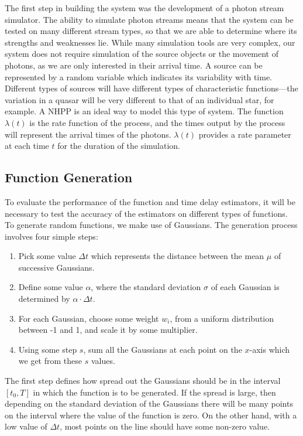 \documentclass[a4paper,11pt]{article}
\begin{document}
  The first step in building the system was the development of a photon stream
  simulator. The ability to simulate photon streams means that the system can be
  tested on many different stream types, so that we are able to determine where
  its strengths and weaknesses lie. While many simulation tools are very
  complex, our system does not require simulation of the source objects or the
  movement of photons, as we are only interested in their arrival time. A source
  can be represented by a random variable which indicates its variability with
  time. Different types of sources will have different types of characteristic
  functions---the variation in a quasar will be very different to that of an
  individual star, for example. A NHPP is an ideal way to model this type of
  system. The function $\lambda(t)$ is the rate function of the process, and the
  times output by the process will represent the arrival times of the
  photons. $\lambda(t)$ provides a rate parameter at each time $t$ for the
  duration of the simulation.
\subsection{Function Generation}
\label{sec-3-1}

   To evaluate the performance of the function and time delay estimators, it
   will be necessary to test the accuracy of the estimators on different types
   of functions. To generate random functions, we make use of Gaussians. The
   generation process involves four simple steps:
\begin{enumerate}
\item Pick some value $\Delta t$ which represents the distance between the mean
   $\mu$ of successive Gaussians.
\item Define some value $\alpha$, where the standard deviation $\sigma$ of each
   Gaussian is determined by $\alpha\cdot\Delta t$.
\item For each Gaussian, choose some weight $w_i$, from a uniform distribution
   between -1 and 1, and scale it by some multiplier.
\item Using some step $s$, sum all the Gaussians at each point on the $x$-axis which
   we get from these $s$ values.
\end{enumerate}

   The first step defines how spread out the Gaussians should be in the interval
   $[t_0, T]$ in which the function is to be generated. If the spread is large,
   then depending on the standard deviation of the Gaussians there will be many
   points on the interval where the value of the function is zero. On the other
   hand, with a low value of $\Delta t$, most points on the line should have some
   non-zero value.
\end{document}

